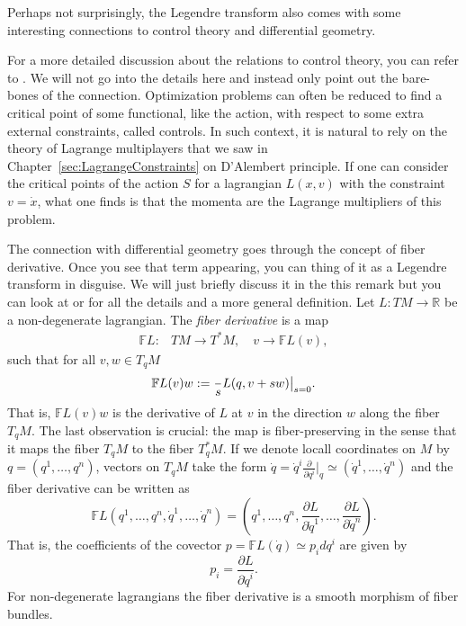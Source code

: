 \documentclass[english,fontsize=11pt,paper=a5,oneside]{scrbook}
\newcommand{\R}{\mathbb{R}}
\let\d\relax
\newcommand{\d}{\mathrm{d}}
\theoremstyle{definition}
\newenvironment{remark}
  {\pushQED{\qed}\renewcommand{\qedsymbol}{$\lozenge$}\remarkx}
  {\popQED\endremarkx}
\begin{document}
\begin{remark}
  Perhaps not surprisingly, the Legendre transform also comes with some interesting connections to control theory and differential geometry.

  For a more detailed discussion about the relations to control theory, you can refer to \cite[Appendix II]{book:gelfand}.
  We will not go into the details here and instead only point out the bare-bones of the connection.
  Optimization problems can often be reduced to find a critical point of some functional, like the action, with respect to some extra external constraints, called controls.
  In such context, it is natural to rely on the theory of Lagrange multiplayers that we saw in Chapter~\ref{sec:LagrangeConstraints} on D'Alembert principle.
  If one can consider the critical points of the action $S$ for a lagrangian $L(x,v)$ with the constraint $v=\dot x$, what one finds is that the momenta are the Lagrange multipliers of this problem.

  The connection with differential geometry goes through the concept of fiber derivative. Once you see that term appearing, you can thing of it as a Legendre transform in disguise. We will just briefly discuss it in the this remark but you can look at \cite[Chapter 7.2]{book:marsdenratiu} or \cite[Chapter 3.5]{book:amr} for all the details and a more general definition.
  Let $L:TM \to \R$ be a non-degenerate lagrangian. The \emph{fiber derivative} is a map
  \begin{align}
    \mathbb{F}L :& TM \to T^*M, \quad v \to \mathbb{F}L(v),
  \end{align}
  such that for all $v,w \in T_q M$
  \begin{align}
    \mathbb{F}L(v) w := \frac{\d}{\d s} L(q, v + s w) \big|_{s=0}.
  \end{align}
  That is, $\mathbb{F}L(v) w$ is the derivative of $L$ at $v$ in the direction $w$ along the fiber $T_qM$.
  The last observation is crucial: the map is fiber-preserving in the sense that it maps the fiber $T_qM$ to the fiber $T^*_qM$.
  If we denote locall coordinates on $M$ by $q=(q^1, \ldots, q^n)$, vectors on $T_qM$ take the form $\dot q = \dot q^i \frac{\partial}{\partial q^i}\big|_q \simeq (\dot q^1, \ldots, \dot q^n)$ and the fiber derivative can be written as
  \begin{equation}
    \mathbb{F}L(q^1, \ldots, q^n, \dot q^1, \ldots,\dot q^n) = \left(q^1, \ldots, q^n, \frac{\partial L}{\partial \dot q^1}, \ldots, \frac{\partial L}{\partial \dot q^n}\right).
  \end{equation}
  That is, the coefficients of the covector $p = \mathbb{F}L(\dot q) \simeq p_i dq^i$ are given by
  \begin{equation}
    p_i = \frac{\partial L}{\partial \dot q^i}.
  \end{equation}
  For non-degenerate lagrangians the fiber derivative is a smooth morphism of fiber bundles.


\end{remark}
\end{document}
